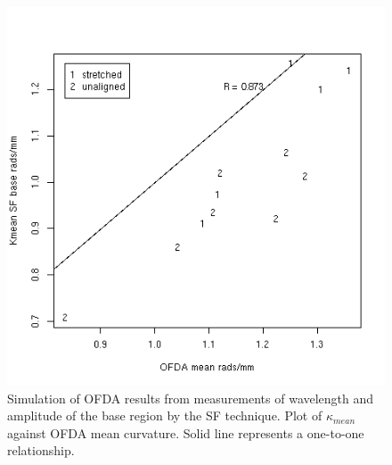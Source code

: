 %

\begin{figure}[!h]
  \centering
  \includegraphics[width=1.0\textwidth]{figofdasimsfbasemean.png}
  \caption{Simulation of OFDA results from measurements of wavelength and amplitude of the base region by the SF technique. Plot of $\kappa_{mean}$ against OFDA mean curvature. Solid line represents a one-to-one relationship.}
\label{fig:ofdasimsfbasemean}
\end{figure}

%

